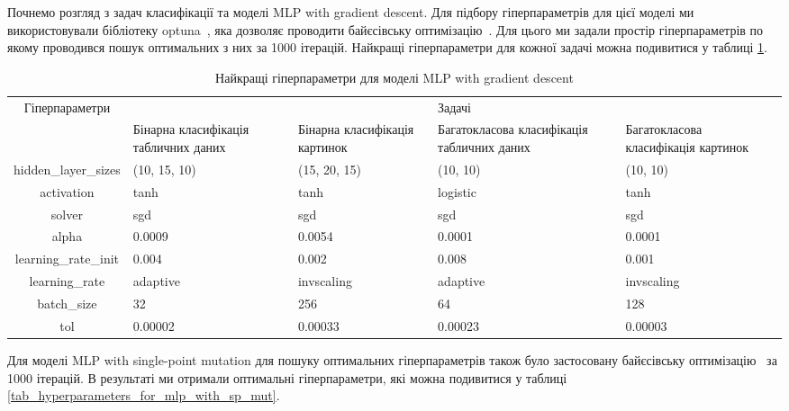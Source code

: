 Почнемо розгляд з задач класифікації та моделі MLP with gradient descent. Для підбору гіперпараметрів для цієї моделі ми використовували бібліотеку optuna~\cite{ct22}, яка дозволяє проводити байєсівську оптимізацію~\cite{ct37}. Для цього ми задали простір гіперпараметрів по якому проводився пошук оптимальних з них за 1000 ітерацій. Найкращі гіперпараметри для кожної задачі можна подивитися у таблиці \ref{tab_hyperparameters_for_mlp_with_gd}.

\begin{table}[ht]
	\centering
	\begin{adjustbox}{max width=\textwidth}
		\begin{tabular}{|c|p{3cm}|p{3cm}|p{3cm}|p{3cm}|}
			\hline \multirow{2}{*}{Гіперпараметри} & \multicolumn{4}{c|}{Задачі} \\
			\cline{2-5} & Бінарна класифікація табличних даних & Бінарна класифікація картинок & Багатокласова класифікація табличних даних & Багатокласова класифікація картинок \\
			\hline hidden\_layer\_sizes & (10, 15, 10) & (15, 20, 15) & (10, 10) & (10, 10) \\
			\hline activation & tanh & tanh & logistic & tanh \\
			\hline solver & sgd & sgd & sgd & sgd \\
			\hline alpha & 0.0009 & 0.0054 & 0.0001 & 0.0001 \\
			\hline learning\_rate\_init & 0.004 & 0.002 & 0.008 & 0.001 \\
			\hline learning\_rate & adaptive & invscaling & adaptive & invscaling \\
			\hline batch\_size & 32 & 256 & 64 & 128 \\
			\hline tol & 0.00002 & 0.00033 & 0.00023 & 0.00003 \\
			\hline
		\end{tabular}
	\end{adjustbox}
	\caption{Найкращі гіперпараметри для моделі MLP with gradient descent}
	\label{tab_hyperparameters_for_mlp_with_gd}
\end{table}

Для моделі MLP with single-point mutation для пошуку оптимальних гіперпараметрів також було застосовану байєсівську оптимізацію~\cite{ct37} за 1000 ітерацій. В результаті ми отримали оптимальні гіперпараметри, які можна подивитися у таблиці \ref{tab_hyperparameters_for_mlp_with_sp_mut}.


